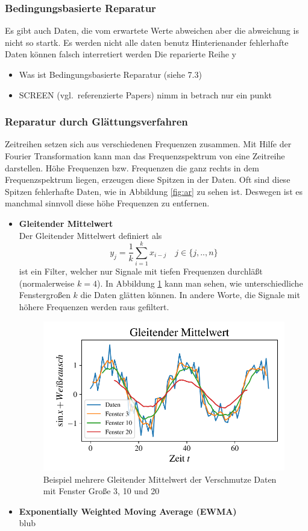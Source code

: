 \subsubsection{Bedingungsbasierte Reparatur}
Es gibt auch Daten, die vom erwartete Werte abweichen aber die abweichung is
nicht so startk. 
Es werden nicht alle daten benutz
Hinterienander fehlerhafte Daten können falsch interretiert werden
Die reparierte Reihe y

\begin{itemize}
  \item Was ist Bedingungsbasierte Reparatur (siehe 7.3)
  \item SCREEN (vgl.\ referenzierte Papers) 
  nimm in betrach nur ein punkt
\end{itemize}
\subsubsection{Reparatur durch Glättungsverfahren}
Zeitreihen setzen sich aus verschiedenen Frequenzen zusammen. Mit Hilfe der
Fourier Transformation kann man das Frequenzspektrum von eine Zeitreihe
darstellen. Höhe Frequenzen bzw. Frequenzen die ganz rechts in dem
Frequenzspektrum liegen, erzeugen diese Spitzen in der Daten. Oft sind diese
Spitzen fehlerhafte Daten, wie in Abbildung \ref{fig:ar} zu sehen ist. Deswegen
ist es manchmal sinnvoll diese höhe Frequenzen zu entfernen.
\begin{itemize}
  \item \textbf{Gleitender Mittelwert}\\
Der Gleitender Mittelwert definiert als 
\[
    y_j = \frac{1}{k}\sum_{i=1}^{k}x_{i-j} \quad j \in \{j,..,n\}
\] 
ist ein Filter, welcher nur Signale mit tiefen Frequenzen durchläßt
(normalerweise $k=4$). In Abbildung \ref{fig:rolling} kann man sehen, wie
unterschiedliche Fenstergroßen $k$ die Daten glätten können. In andere Worte,
die Signale mit höhere Frequenzen werden raus gefiltert.
\begin{figure}[h]
      \centering
      \includegraphics[width=\textwidth,keepaspectratio]{../plots/Gleitender_Mittelwert.pdf}
      \caption{Beispiel mehrere Gleitender Mittelwert der 
      Verschmutze Daten mit Fenster Große 3, 10 und 20}
      \label{fig:rolling}
\end{figure}
  \item  \textbf{Exponentially Weighted Moving Average (EWMA)}\\
  blub
 \end{itemize}

